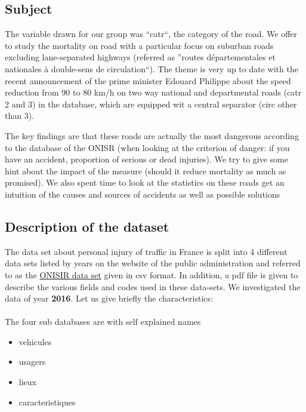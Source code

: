 \documentclass[a4paper]{article}
\theoremstyle{definition}
\theoremstyle{proposition}
\begin{document}
\subsection{Subject}
The variable drawn for our group was ``catr``, the category of the road. We offer to study the mortality on road with a particular focus on suburban roads excluding lane-separated highways (referred as ''routes départementales et nationales à double-sens de circulation``). The theme is very up to date with the recent announcement of the prime minister Edouard Philippe about the speed reduction from 90 to 80 km/h on two way national and departmental roads (catr 2 and 3) in the database, which are equipped wit a central separator (circ other than 3).

The key findings are that these roads are actually the most dangerous according to the database of the ONISR (when looking at the criterion of danger: if you have an accident, proportion of serious or dead injuries). We try to give some hint about the impact of the measure (should it reduce mortality as much as promised). We also spent time to look at the statistics on these roads get an intuition of the causes and sources of accidents as well as possible solutions

\subsection{Description of the dataset}
The data set about personal injury of traffic in France is split into 4 different data sets listed by years on the website of the public administration and referred to as the  \href{https://www.data.gouv.fr/fr/datasets/base-de-donnees-accidents-corporels-de-la-circulation/}{ONISIR data set} given in csv format. In addition, a pdf file is given to describe the various fields and codes used in these data-sets. We investigated the data of year \textbf{2016}. Let us give briefly the characteristics:
\\
\\
The four sub databases are with self explained names
\begin{itemize}
\item vehicules
\item usagers
\item lieux
\item caracteristiques
\end{itemize}
\end{document}
